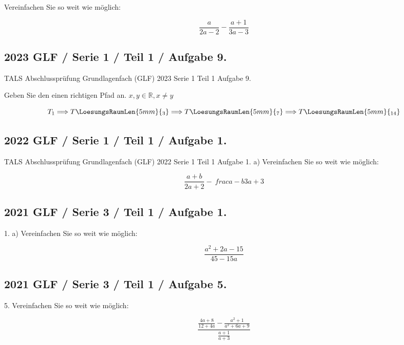 {Vereinfachen Sie so weit wie möglich:

$$\frac{a}{2a-2} - \frac{a+1}{3a-3}$$

\subsection*{2023 GLF / Serie 1 / Teil 1 / Aufgabe 9.}
TALS Abschlussprüfung Grundlagenfach (GLF) 2023 Serie 1 Teil 1 Aufgabe
9.

Geben Sie den einen richtigen Pfad an. $x,y \in \mathbb{R}, x\ne y$


$$T_1 \Longrightarrow T\LoesungsRaumLen{5mm}{{}_3} \Longrightarrow
T\LoesungsRaumLen{5mm}{{}_7} \Longrightarrow T\LoesungsRaumLen{5mm}{{}_{14}}$$

\subsection*{2022 GLF / Serie 1 / Teil 1 / Aufgabe 1.}
TALS Abschlussprüfung Grundlagenfach (GLF) 2022 Serie 1 Teil 1 Aufgabe
1. a) Vereinfachen Sie so weit wie möglich:

$$\frac{a+b}{2a+2} - \ frac{a-b}{3a+3}$$


\subsection*{2021 GLF / Serie 3 / Teil 1 / Aufgabe 1.}

1. a) Vereinfachen Sie so weit wie möglich:

$$\frac{a^2+2a-15}{45-15a}$$



\subsection*{2021 GLF / Serie 3 / Teil 1 / Aufgabe 5.}

5. Vereinfachen Sie so weit wie möglich:

$$\frac{\frac{4a+8}{12+4a} - \frac{a^2+1}{a^2+6a+9}}{\frac{a+1}{a+3}}$$

}
